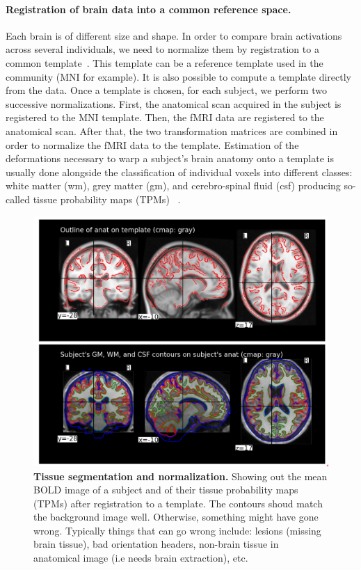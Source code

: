 \paragraph{Registration of brain data into a common reference space.}
Each brain is of different size
and shape. In order to compare brain activations across several individuals, we
need to normalize them by registration to a common template~\citep{fristonbook,ashburner2005,ashburner2007,pmid19195496}. This template
can be a reference template used in the community (MNI for example). It is
also possible to compute a template directly from the data. Once a template
is chosen, for each subject, we perform two successive normalizations. First,
the anatomical scan acquired in the subject is registered to the MNI template.
Then, the fMRI data are registered to the anatomical scan. After that, the two
transformation matrices are combined in order to normalize the fMRI data to
the template. Estimation of the deformations necessary to warp a subject's brain anatomy onto a template is usually done alongside the classification of individual voxels into different classes: white matter (wm), grey matter (gm), and cerebro-spinal fluid (csf) producing so-called tissue probability maps (TPMs) ~\citep{ashburner2005}.

\begin{figure}
  \includegraphics[width=1\linewidth]{figures/normalize.png}
  \caption{\textbf{Tissue segmentation and normalization.} Showing out the mean BOLD image of a subject and of their tissue probability maps (TPMs) after registration to a template. The contours shoud match the background image well. Otherwise, something might have gone wrong.
    Typically things that can go wrong include:
    lesions (missing brain tissue), bad orientation headers,
non-brain tissue in anatomical image (i.e needs brain
extraction), etc.}
\end{figure}

